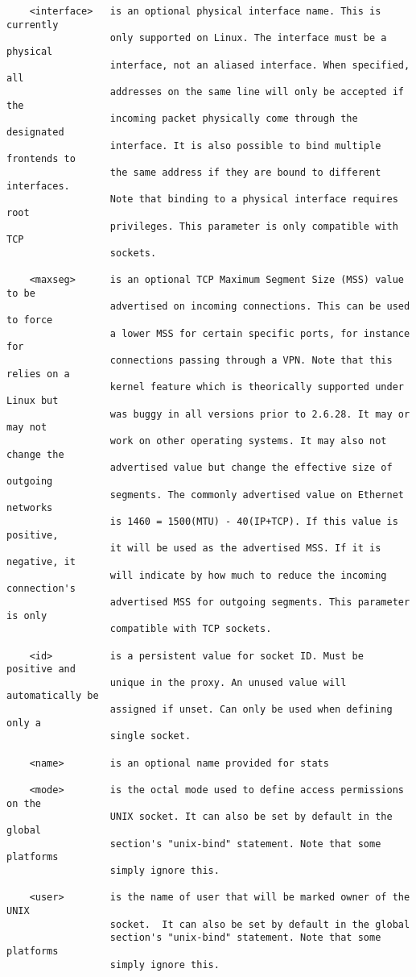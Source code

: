 \begin{verbatim}
    <interface>   is an optional physical interface name. This is currently
                  only supported on Linux. The interface must be a physical
                  interface, not an aliased interface. When specified, all
                  addresses on the same line will only be accepted if the
                  incoming packet physically come through the designated
                  interface. It is also possible to bind multiple frontends to
                  the same address if they are bound to different interfaces.
                  Note that binding to a physical interface requires root
                  privileges. This parameter is only compatible with TCP
                  sockets.

    <maxseg>      is an optional TCP Maximum Segment Size (MSS) value to be
                  advertised on incoming connections. This can be used to force
                  a lower MSS for certain specific ports, for instance for
                  connections passing through a VPN. Note that this relies on a
                  kernel feature which is theorically supported under Linux but
                  was buggy in all versions prior to 2.6.28. It may or may not
                  work on other operating systems. It may also not change the
                  advertised value but change the effective size of outgoing
                  segments. The commonly advertised value on Ethernet networks
                  is 1460 = 1500(MTU) - 40(IP+TCP). If this value is positive,
                  it will be used as the advertised MSS. If it is negative, it
                  will indicate by how much to reduce the incoming connection's
                  advertised MSS for outgoing segments. This parameter is only
                  compatible with TCP sockets.

    <id>          is a persistent value for socket ID. Must be positive and
                  unique in the proxy. An unused value will automatically be
                  assigned if unset. Can only be used when defining only a
                  single socket.

    <name>        is an optional name provided for stats

    <mode>        is the octal mode used to define access permissions on the
                  UNIX socket. It can also be set by default in the global
                  section's "unix-bind" statement. Note that some platforms
                  simply ignore this.

    <user>        is the name of user that will be marked owner of the UNIX
                  socket.  It can also be set by default in the global
                  section's "unix-bind" statement. Note that some platforms
                  simply ignore this.


\end{verbatim}
